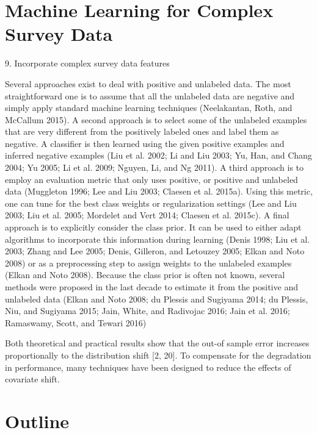 \section{Machine Learning for Complex Survey Data}

9.   Incorporate complex survey data features 


Several approaches exist to deal with positive and unlabeled data. The most straightforward one is to assume that all the unlabeled data are negative and simply apply standard machine learning techniques (Neelakantan, Roth, and McCallum 2015). A second approach is to select some of the unlabeled examples that are very different from the positively labeled ones and label them as negative. A classiﬁer is then learned using the given positive examples and inferred negative examples (Liu et al. 2002; Li and Liu 2003; Yu, Han, and Chang 2004; Yu 2005; Li et al. 2009; Nguyen, Li, and Ng 2011). A third approach is to employ an evaluation metric that only uses positive, or positive and unlabeled data (Muggleton 1996; Lee and Liu 2003; Claesen et al. 2015a). Using this metric, one can tune for the best class weights or regularization settings (Lee and Liu 2003; Liu et al. 2005; Mordelet and Vert 2014; Claesen et al. 2015c). A ﬁnal approach is to explicitly consider the class prior. It can be used to either adapt algorithms to incorporate this information during learning (Denis 1998; Liu et al. 2003; Zhang and Lee 2005; Denis, Gilleron, and Letouzey 2005; Elkan and Noto 2008) or as a preprocessing step to assign weights to the unlabeled examples (Elkan and Noto 2008). Because the class prior is often not known, several methods were proposed in the last decade to estimate it from the positive and unlabeled data (Elkan and Noto 2008; du Plessis and Sugiyama 2014; du Plessis, Niu, and Sugiyama 2015; Jain, White, and Radivojac 2016; Jain et al. 2016; Ramaswamy, Scott, and Tewari 2016) 

Both theoretical and practical results show that the out-of sample error increases proportionally to the distribution shift [2, 20]. To compensate for the degradation in performance, many techniques have been designed to reduce the effects of covariate shift.

\section{Outline}

